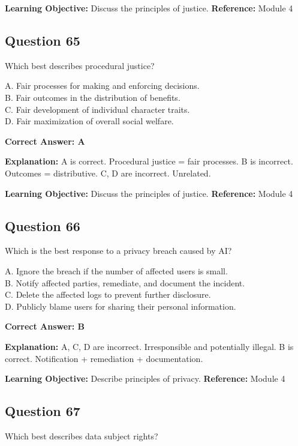 \documentclass[11pt]{article}
\begin{document}
	\textbf{Learning Objective:} Discuss the principles of justice.
	\textbf{Reference:} Module 4
	
	\subsection*{Question 65}
	Which best describes procedural justice?
	
	A. Fair processes for making and enforcing decisions.\\
	B. Fair outcomes in the distribution of benefits.\\
	C. Fair development of individual character traits.\\
	D. Fair maximization of overall social welfare.
	
	\vspace{0.4em}
	\textbf{Correct Answer: A}
	
	\textbf{Explanation:}
	A is correct. Procedural justice = fair processes.
	B is incorrect. Outcomes = distributive.
	C, D are incorrect. Unrelated.
	
	\textbf{Learning Objective:} Discuss the principles of justice.
	\textbf{Reference:} Module 4
	
	\subsection*{Question 66}
	Which is the best response to a privacy breach caused by AI?
	
	A. Ignore the breach if the number of affected users is small.\\
	B. Notify affected parties, remediate, and document the incident.\\
	C. Delete the affected logs to prevent further disclosure.\\
	D. Publicly blame users for sharing their personal information.
	
	\vspace{0.4em}
	\textbf{Correct Answer: B}
	
	\textbf{Explanation:}
	A, C, D are incorrect. Irresponsible and potentially illegal.
	B is correct. Notification + remediation + documentation.
	
	\textbf{Learning Objective:} Describe principles of privacy.
	\textbf{Reference:} Module 4
	
	\subsection*{Question 67}
	Which best describes data subject rights?
	
\end{document}
